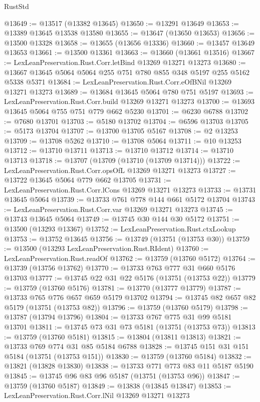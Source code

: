 \begin{lexlean}{RustStd}
\begin{coremodule}
@13649 := @13517 (@13382 @13645)
@13650 := @13291 @13649
@13653 := @13389 @13645 @13538 @13580
@13655 := @13647 (@13650 @13653)
@13656 := @13500 @13328
@13658 := @13655 (@13656 @13336)
@13660 := @13457 @13649 @13653
@13661 := @13500 @13361
@13663 := @13660 (@13661 @13516)
@13667 := LexLeanPreservation.Rust.Corr.letBind @13269 @13271 @13273
@13680 := @13667 @13645 @5064 @5064 @255 @751 @780 @855 @348 @5197 @255 @5162 @5338 @5371
@13684 := LexLeanPreservation.Rust.Corr.eOfBNil @13269 @13271 @13273
@13689 := @13684 @13645 @5064 @780 @751 @5197
@13693 := LexLeanPreservation.Rust.Corr.build @13269 @13271 @13273
@13700 := @13693 @13645 @5064 @755 @751 @779 @662 @5230
@13701 := @6230 @6788
@13702 := @7680 @13701
@13703 := @5180 @13702
@13704 := @6596 @13703
@13705 := @5173 @13704
@13707 := @13700 @13705 @5167
@13708 := @2 @13253
@13709 := @13708 @5262
@13710 := @13708 @5064
@13711 := @10 @13253
@13712 := @13710 @13711
@13713 := @13710 @13712
@13714 := @13710 @13713
@13718 := @13707 (@13709 (@13710 (@13709 @13714)))
@13722 := LexLeanPreservation.Rust.Corr.opsOfL @13269 @13271 @13273
@13727 := @13722 @13645 @5064 @779 @662 @13705
@13731 := LexLeanPreservation.Rust.Corr.lCons @13269 @13271 @13273
@13733 := @13731 @13645 @5064
@13739 := @13733 @761 @778 @144 @661 @5172 @13704
@13743 := LexLeanPreservation.Rust.Corr.var @13269 @13271 @13273
@13745 := @13743 @13645 @5064
@13749 := @13745 @30 @144 @30 @5172
@13751 := @13500 (@13293 @13367)
@13752 := LexLeanPreservation.Rust.ctxLookup
@13753 := @13752 @13645
@13756 := @13749 (@13751 (@13753 @30))
@13759 := @13500 (@13293 LexLeanPreservation.Rust.RIdent)
@13760 := LexLeanPreservation.Rust.readOf
@13762 := @13759 (@13760 @5172)
@13764 := @13739 (@13756 @13762)
@13770 := @13733 @763 @777 @31 @660 @5176 @13703
@13777 := @13745 @22 @31 @22 @5176 (@13751 (@13753 @22))
@13779 := @13759 (@13760 @5176)
@13781 := @13770 (@13777 @13779)
@13787 := @13733 @765 @776 @657 @659 @5179 @13702
@13794 := @13745 @82 @657 @82 @5179 (@13751 (@13753 @82))
@13796 := @13759 (@13760 @5179)
@13798 := @13787 (@13794 @13796)
@13804 := @13733 @767 @775 @31 @99 @5181 @13701
@13811 := @13745 @73 @31 @73 @5181 (@13751 (@13753 @73))
@13813 := @13759 (@13760 @5181)
@13815 := @13804 (@13811 @13813)
@13821 := @13733 @769 @774 @31 @85 @5184 @6788
@13828 := @13745 @151 @31 @151 @5184 (@13751 (@13753 @151))
@13830 := @13759 (@13760 @5184)
@13832 := @13821 (@13828 @13830)
@13838 := @13733 @771 @773 @83 @11 @5187 @5190
@13845 := @13745 @96 @83 @96 @5187 (@13751 (@13753 @96))
@13847 := @13759 (@13760 @5187)
@13849 := @13838 (@13845 @13847)
@13853 := LexLeanPreservation.Rust.Corr.lNil @13269 @13271 @13273

\end{coremodule}
\end{lexlean}
